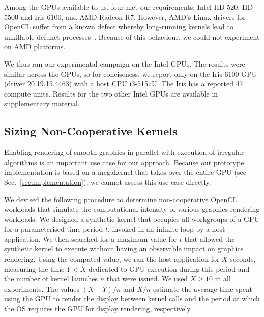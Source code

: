 \documentclass[parskip=half,sigconf,review, anonymous=true, acmcopyrightmode=none]{acmart}
\newcommand{\mysec}{Sec.~}
\begin{document}
Among the GPUs available to us, four met our requirements: Intel HD
520, HD 5500 and Iris 6100, and AMD Radeon R7.  However, AMD's Linux
drivers for OpenCL suffer from a known defect whereby long-running
kernels lead to unkillable defunct
processes~\cite{amd-defunct-process}. Because of this behaviour, we
could not experiment on AMD platforms.


We thus ran our experimental campaign on the Intel GPUs. The results
were similar across the GPUs, so for conciseness, we report only on
the Iris 6100 GPU (driver 20.19.15.4463) with a host CPU i3-5157U. The
Iris has a reported 47 compute units. Results for the two other Intel
GPUs are available in supplementary material.


\subsection{Sizing Non-Cooperative Kernels}\label{sec:sizingnoncoop}

Enabling rendering of smooth graphics in parallel with execution of irregular algorithms is an important use case for our approach.  Because our prototype implementation is based on a megakernel that takes over the entire GPU (see \mysec\ref{sec:implementation}), we cannot assess this use case directly.

We devised the following
procedure to determine non-cooperative OpenCL workloads that simulate
the computational intensity of various graphics rendering workloads.
%
We designed a synthetic kernel that occupies all workgroups of a
GPU for a parameterised time period $t$, invoked in an infinite loop by a host application.  We then
searched for a maximum value for $t$ that allowed the
synthetic kernel to execute without having an observable impact on
graphics rendering.  Using the computed value, we
ran the host application for $X$ seconds, measuring the time $Y < X$
dedicated to GPU execution during this period and the number
of kernel launches $n$ that were issued.  We used $X \geq 10$ in all
experiments.  The values $(X-Y)/n$ and $X/n$ estimate the average time
spent using the GPU to render the display between kernel calls and the
period at which the OS requires the GPU for display rendering,
respectively.
\end{document}
